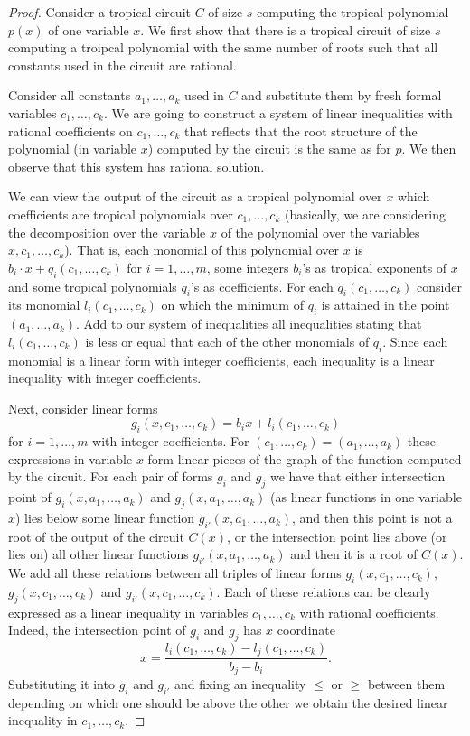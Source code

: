 \documentclass[11pt]{article}
\begin{document}
\begin{proof}
Consider a tropical circuit $C$ of size $s$ computing the tropical polynomial $p(x)$ of one variable $x$. We first show that there is a tropical circuit of size $s$ computing a troipcal polynomial with the same number of roots such that all constants used in the circuit are rational.

Consider all constants $a_1,\ldots, a_k$ used in $C$ and substitute them by fresh formal variables $c_1,\ldots, c_k$. We are going to construct a system of linear inequalities with rational coefficients on $c_1,\ldots, c_k$ that reflects that the root structure of the polynomial (in variable $x$) computed by the circuit is the same as for $p$. We then observe that this system has rational solution.

We can view the output of the circuit as a tropical polynomial over $x$ which coefficients are tropical polynomials over $c_1,\ldots, c_k$ (basically, we are considering the decomposition over the variable $x$ of the polynomial over the variables $x, c_1, \ldots, c_k$). That is, each monomial of this polynomial over $x$ is $b_i \cdot x + q_i(c_1,\ldots, c_k)$ for $i=1,\ldots, m$, some integers $b_i$'s as tropical exponents of $x$ and some tropical polynomials $q_i$'s as coefficients. For each $q_i(c_1,\ldots,c_k)$ consider its monomial $l_i(c_1,\ldots, c_k)$ on which the minimum of $q_i$ is attained in the point $(a_1,\ldots, a_k)$. Add to our system of inequalities all inequalities stating that $l_i(c_1,\ldots, c_k)$ is less or equal that each of the other monomials of $q_i$. Since each monomial is a linear form with integer coefficients, each inequality is a linear inequality with integer coefficients.

Next, consider linear forms 
$$
g_i(x, c_1, \ldots, c_k)=b_i x + l_i(c_1,\ldots, c_k)
$$ 
for $i=1,\ldots, m$ with integer coefficients. For $(c_1,\ldots, c_k) = (a_1,\ldots, a_k)$ these expressions in variable $x$ form linear pieces of the graph of the function computed by the circuit. For each pair of forms $g_i$ and $g_j$ we have that either intersection point of $g_i(x, a_1, \ldots, a_k)$ and $g_j(x, a_1, \ldots, a_k)$ (as linear functions in one variable $x$) lies below some linear function $g_{i'}(x,a_1,\ldots, a_k)$, and then this point is not a root of the output of the circuit $C(x)$, or the intersection point lies above (or lies on) all other linear functions $g_{i'}(x,a_1,\ldots, a_k)$ and then it is a root of $C(x)$. We add all these relations between all triples of linear forms $g_i(x,c_1,\ldots, c_k)$, $g_j(x,c_1,\ldots, c_k)$ and $g_{i'}(x,c_1,\ldots, c_k)$. Each of these relations can be clearly expressed as a linear inequality in variables $c_1,\ldots, c_k$ with rational coefficients. Indeed, the intersection point of $g_i$ and $g_j$ has $x$ coordinate
$$
x= \frac{l_i(c_1,\ldots, c_k) - l_j(c_1,\ldots, c_k)}{b_j-b_i}.
$$
Substituting it into $g_i$ and $g_{i'}$ and fixing an inequality $\leq$ or $\geq$ between them depending on which one should be above the other we obtain the desired linear inequality in $c_1,\ldots, c_k$.


\end{proof}
\end{document}
